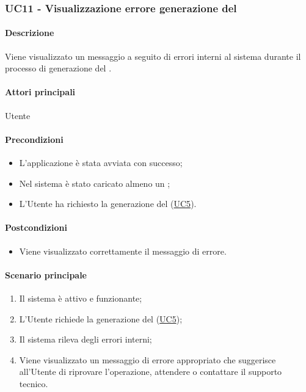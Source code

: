 \subsubsection{UC11 - Visualizzazione errore generazione del }\label{UC11}
\paragraph*{Descrizione}
Viene visualizzato un messaggio a seguito di errori interni al sistema durante il processo di generazione del .

\paragraph*{Attori principali}
Utente

\paragraph*{Precondizioni}
\begin{itemize}
  \item L'applicazione è stata avviata con successo;
  \item Nel sistema è stato caricato almeno un ;
  \item L'Utente ha richiesto la generazione del  (\hyperref[UC5]{UC5}).  
\end{itemize}

\paragraph*{Postcondizioni}
\begin{itemize}
  \item Viene visualizzato correttamente il messaggio di errore.
\end{itemize}

\paragraph*{Scenario principale}
\begin{enumerate}
  \item Il sistema è attivo e funzionante;
  \item L'Utente richiede la generazione del  (\hyperref[UC5]{UC5});
  \item Il sistema rileva degli errori interni;
  \item Viene visualizzato un messaggio di errore appropriato che suggerisce all'Utente di riprovare l'operazione, attendere o contattare il supporto tecnico.
\end{enumerate}
